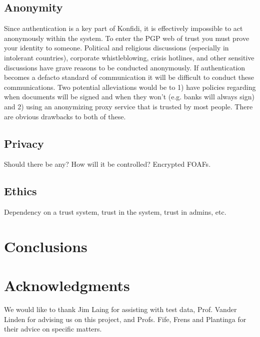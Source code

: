 \documentclass{acm_proc_article-sp}
\begin{document}
\subsection{Anonymity}
Since authentication is a key part of Konfidi, it is effectively impossible to act anonymously within the system.  To enter the PGP web of trust you must prove your identity to someone.  Political and religious discussions (especially in intolerant countries), corporate whistleblowing, crisis hotlines, and other sensitive discussions have grave reasons to be conducted anonymously.  If authentication becomes a defacto standard of communication it will be difficult to conduct these communications.  Two potential alleviations would be to 1) have policies regarding when documents will be signed and when they won't (e.g. banks will always sign) and 2) using an anonymizing proxy service that is trusted by most people.  There are obvious drawbacks to both of these.\cite{fenton05iim}

\subsection{Privacy}
Should there be any?  How will it be controlled?
Encrypted FOAFs.

\subsection{Ethics}
Dependency on a trust system, trust in the system, trust in admins, etc.

\section{Conclusions}

\section{Acknowledgments}
We would like to thank Jim Laing for assisting with test data, Prof. Vander Linden for advising us on this project, and Profs. Fife, Frens and Plantinga for their advice on specific matters.

%
%


  

%
%
\end{document}
